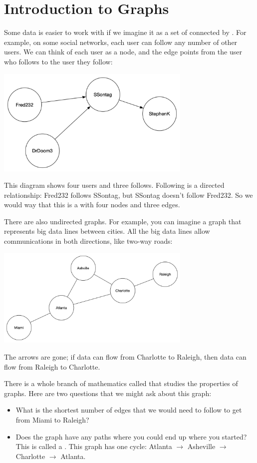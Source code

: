\chapter{Introduction to Graphs}

Some data is easier to work with if we imagine it as a set of
 connected by . For example, on some
social networks, each user can follow any number of other users. We
can think of each user as a node, and the edge points from the user who
follows to the user they follow:

\includegraphics[width=0.7\textwidth]{simpledirected.png}

This diagram shows four users and three follows. Following is a
directed relationship: Fred232 follows SSontag, but SSontag doesn't
follow Fred232. So we would way that this is a  with four nodes and three edges.

There are also undirected graphs. For example, you can imagine a
graph that represents big data lines between cities. All the big data
lines allow communications in both directions, like two-way roads:

\includegraphics[width=0.7\textwidth]{simpleundirected.png}

The arrows are gone; if data can flow from Charlotte to Raleigh, then
data can flow from Raleigh to Charlotte.

There is a whole branch of mathematics called 
that studies the properties of graphs. Here are two questions that we
might ask about this graph:
\begin{itemize}
\item What is the shortest number of edges that we would need to follow to get from Miami to Raleigh?
\item Does the graph have any paths where you could end up where you
 started? This is called a . This graph has one
 cycle: Atlanta $\rightarrow$ Asheville $\rightarrow$ Charlotte
 $\rightarrow$ Atlanta.
\end{itemize}

